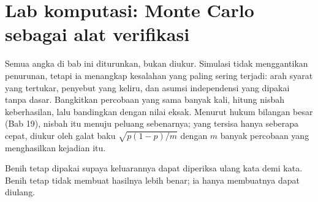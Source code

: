 
\section{Lab komputasi: Monte Carlo sebagai alat verifikasi}

Semua angka di bab ini diturunkan, bukan diukur. Simulasi tidak menggantikan penurunan,
tetapi ia menangkap kesalahan yang paling sering terjadi: arah syarat yang tertukar,
penyebut yang keliru, dan asumsi independensi yang dipakai tanpa dasar. Bangkitkan
percobaan yang sama banyak kali, hitung nisbah keberhasilan, lalu bandingkan dengan nilai
eksak. Menurut hukum bilangan besar (Bab 19), nisbah itu menuju peluang sebenarnya; yang
tersisa hanya seberapa cepat, diukur oleh galat baku $\sqrt{p(1-p)/m}$ dengan $m$ banyak
percobaan yang menghasilkan kejadian itu.


Benih tetap dipakai supaya keluarannya dapat diperiksa ulang kata demi kata. Benih tetap
tidak membuat hasilnya lebih benar; ia hanya membuatnya dapat diulang.

